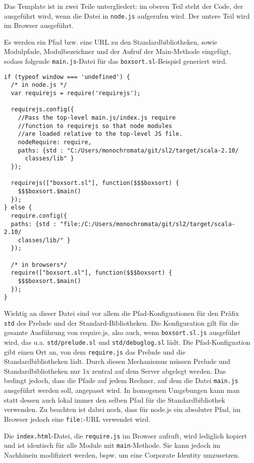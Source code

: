 \documentclass[runningheads]{llncs}
\begin{document}
Das Template ist in zwei Teile untergliedert: im oberen Teil steht
der Code, der ausgeführt wird, wenn die Datei in \texttt{node.js}
aufgerufen wird. Der untere Teil wird im Browser ausgeführt.

Es werden ein Pfad bzw. eine URL zu den Standardbibliotheken, sowie
Modulpfade, Modulbezeichner und der Aufruf der Main-Methode eingefügt,
sodass folgende \texttt{main.js}-Datei für das
\texttt{boxsort.sl}-Beispiel generiert wird.

\begin{verbatim}
if (typeof window === 'undefined') {
  /* in node.js */
  var requirejs = require('requirejs');

  requirejs.config({
    //Pass the top-level main.js/index.js require
    //function to requirejs so that node modules
    //are loaded relative to the top-level JS file.
    nodeRequire: require,
    paths: {std : "C:/Users/monochromata/git/sl2/target/scala-2.10/
      classes/lib" }
  });

  requirejs(["boxsort.sl"], function($$$boxsort) {
    $$$boxsort.$main()
  });
} else {
  require.config({
  paths: {std : "file:/C:/Users/monochromata/git/sl2/target/scala-2.10/
    classes/lib/" }
  });

  /* in browsers*/ 
  require(["boxsort.sl"], function($$$boxsort) {
    $$$boxsort.$main()
  });
}
\end{verbatim}

Wichtig an dieser Datei sind vor allem die Pfad-Konfiguationen für
den Präfix \texttt{std} des Prelude und der Standard-Bibliotheken.
Die Konfiguration gilt für die gesamte Ausführung von require.js, also
auch, wenn \texttt{boxsort.sl.js} ausgeführt wird, das u.a.
\texttt{std/prelude.sl} und \texttt{std/debuglog.sl} lädt. Die
Pfad-Konfiguation gibt einen Ort an, von dem \texttt{require.js}
das Prelude und die Standardbibliotheken lädt. Durch diesen Mechanismus
müssen Prelude und Standardbibliotheken nur 1x zentral auf dem Server
abgelegt werden. Das bedingt jedoch, dass die Pfade auf jedem Rechner,
auf dem die Datei \texttt{main.js} ausgeführt werden soll, angepasst
wird. In homogenen Umgebungen kann man statt dessen auch lokal immer
den selben Pfad für die Standardbibliothek verwenden. Zu beachten
ist dabei noch, dass für node.js ein absoluter Pfad, im Browser jedoch
eine \texttt{file:}-URL verwendet wird.

Die \texttt{index.html}-Datei, die \texttt{require.js} im Browser
aufruft, wird lediglich kopiert und ist identisch für alle Module
mit \texttt{main}-Methode. Sie kann jedoch im Nachhinein modifiziert
werden, bspw. um eine Corporate Identity umzusetzen.
\end{document}
